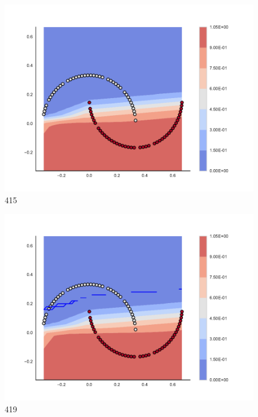 \begin{subfigure}[b]{0.09\textwidth}
    \includegraphics[clip, trim=2.35cm 1.75cm 4.5cm 0cm,width=\textwidth]{img/convergence/415.pdf}
    \caption{415}
    \label{fig:convergence_415}
\end{subfigure}
%
\begin{subfigure}[b]{0.09\textwidth}
    \includegraphics[clip, trim=2.35cm 1.75cm 4.5cm 0cm,width=\textwidth]{img/convergence/419.pdf}
    \caption{419}
    \label{fig:convergence_419}
\end{subfigure}
%
